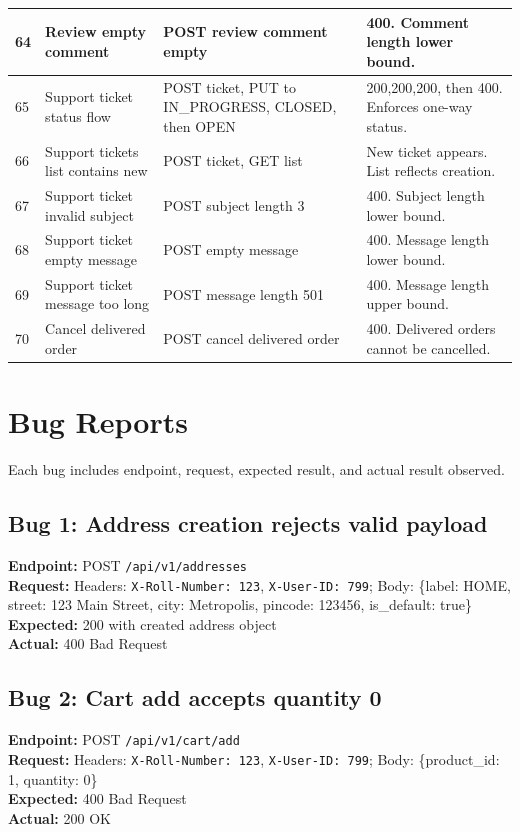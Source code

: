 \documentclass[11pt]{article}
\begin{document}
\begin{longtable}{|p{0.7cm}|p{3.2cm}|p{6.7cm}|p{3.2cm}|}
\hline
64 & Review empty comment & POST review comment empty & 400. Comment length lower bound. \\
\hline
65 & Support ticket status flow & POST ticket, PUT to IN\_PROGRESS, CLOSED, then OPEN & 200,200,200, then 400. Enforces one-way status. \\
\hline
66 & Support tickets list contains new & POST ticket, GET list & New ticket appears. List reflects creation. \\
\hline
67 & Support ticket invalid subject & POST subject length 3 & 400. Subject length lower bound. \\
\hline
68 & Support ticket empty message & POST empty message & 400. Message length lower bound. \\
\hline
69 & Support ticket message too long & POST message length 501 & 400. Message length upper bound. \\
\hline
70 & Cancel delivered order & POST cancel delivered order & 400. Delivered orders cannot be cancelled. \\
\hline
\end{longtable}

\section*{Bug Reports}
Each bug includes endpoint, request, expected result, and actual result observed.

\subsection*{Bug 1: Address creation rejects valid payload}
\textbf{Endpoint:} POST \texttt{/api/v1/addresses} \\
\textbf{Request:} Headers: \texttt{X-Roll-Number: 123}, \texttt{X-User-ID: 799}; Body: \{label: HOME, street: 123 Main Street, city: Metropolis, pincode: 123456, is\_default: true\} \\
\textbf{Expected:} 200 with created address object \\
\textbf{Actual:} 400 Bad Request

\subsection*{Bug 2: Cart add accepts quantity 0}
\textbf{Endpoint:} POST \texttt{/api/v1/cart/add} \\
\textbf{Request:} Headers: \texttt{X-Roll-Number: 123}, \texttt{X-User-ID: 799}; Body: \{product\_id: 1, quantity: 0\} \\
\textbf{Expected:} 400 Bad Request \\
\textbf{Actual:} 200 OK
\end{document}
